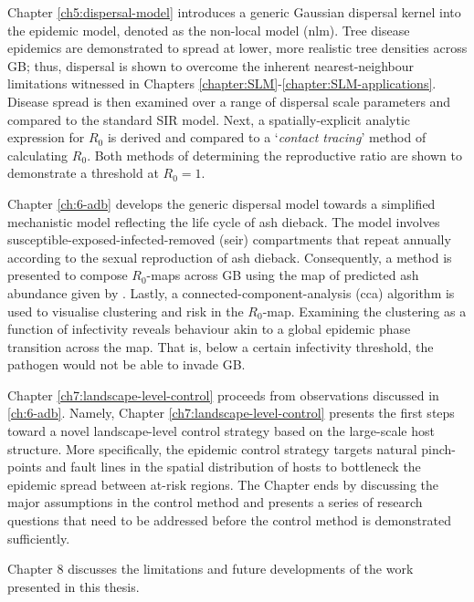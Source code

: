 Chapter \ref{ch5:dispersal-model} introduces a generic Gaussian dispersal kernel into the epidemic model, denoted as the non-local model (\acrshort{nlm}). 
Tree disease epidemics are demonstrated to spread at lower, more realistic tree densities across GB; thus, dispersal is shown to overcome 
the inherent nearest-neighbour limitations witnessed in Chapters \ref{chapter:SLM}-\ref{chapter:SLM-applications}. Disease spread is then examined over a range of dispersal scale parameters and compared to the standard SIR model. Next, a spatially-explicit analytic expression for $R_0$ is derived and compared to a `\textit{contact tracing}' method of calculating $R_0$.
Both methods of determining the reproductive ratio are shown to demonstrate a threshold at $R_0=1$.

Chapter \ref{ch:6-adb} develops the generic dispersal model towards a simplified mechanistic
model reflecting the life cycle of ash dieback. The model involves susceptible-exposed-infected-removed (\acrshort{seir}) compartments that repeat annually according to the sexual reproduction of ash dieback. Consequently, a method is presented to compose $R_0$-maps
across GB using the map of predicted ash abundance given by \cite{hill.data}. Lastly, a connected-component-analysis
(\acrshort{cca}) algorithm is used to visualise  clustering and risk in the $R_0$-map. Examining the clustering as a function
of infectivity reveals behaviour akin to a global epidemic phase transition across the map. That is, below a certain infectivity threshold, 
the pathogen would not be able to invade GB.

Chapter \ref{ch7:landscape-level-control} proceeds from observations discussed in \ref{ch:6-adb}. 
Namely, Chapter \ref{ch7:landscape-level-control} presents the first steps toward a novel landscape-level
control strategy based on the large-scale host structure. More specifically, the epidemic control strategy targets
natural pinch-points and fault lines in the spatial distribution of hosts to bottleneck the epidemic
spread between at-risk regions. The Chapter ends by discussing the major assumptions in the control method and presents
a series of research questions that need to be addressed before the control method is demonstrated sufficiently.

Chapter 8 discusses the limitations and future developments of the work presented in this thesis.